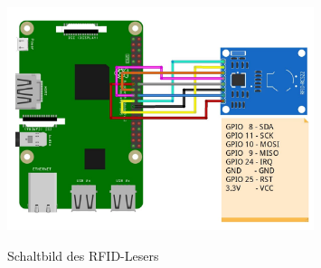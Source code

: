\begin{figure}[H]
  \centering
  \includegraphics[width=0.8\textwidth]{pics/RFID-Schaltbild.png}
  \caption{Schaltbild des RFID-Lesers}
  \cite{RFIDschaltbild}
\end{figure}

